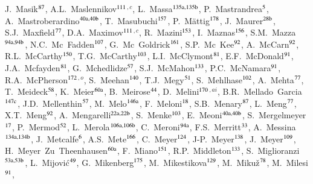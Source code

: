 \begin{flushleft}
J.~Masik$^\textrm{\scriptsize 87}$,
A.L.~Maslennikov$^\textrm{\scriptsize 111}$$^{,c}$,
L.~Massa$^\textrm{\scriptsize 135a,135b}$,
P.~Mastrandrea$^\textrm{\scriptsize 5}$,
A.~Mastroberardino$^\textrm{\scriptsize 40a,40b}$,
T.~Masubuchi$^\textrm{\scriptsize 157}$,
P.~M\"attig$^\textrm{\scriptsize 178}$,
J.~Maurer$^\textrm{\scriptsize 28b}$,
S.J.~Maxfield$^\textrm{\scriptsize 77}$,
D.A.~Maximov$^\textrm{\scriptsize 111}$$^{,c}$,
R.~Mazini$^\textrm{\scriptsize 153}$,
I.~Maznas$^\textrm{\scriptsize 156}$,
S.M.~Mazza$^\textrm{\scriptsize 94a,94b}$,
N.C.~Mc~Fadden$^\textrm{\scriptsize 107}$,
G.~Mc~Goldrick$^\textrm{\scriptsize 161}$,
S.P.~Mc~Kee$^\textrm{\scriptsize 92}$,
A.~McCarn$^\textrm{\scriptsize 92}$,
R.L.~McCarthy$^\textrm{\scriptsize 150}$,
T.G.~McCarthy$^\textrm{\scriptsize 103}$,
L.I.~McClymont$^\textrm{\scriptsize 81}$,
E.F.~McDonald$^\textrm{\scriptsize 91}$,
J.A.~Mcfayden$^\textrm{\scriptsize 81}$,
G.~Mchedlidze$^\textrm{\scriptsize 57}$,
S.J.~McMahon$^\textrm{\scriptsize 133}$,
P.C.~McNamara$^\textrm{\scriptsize 91}$,
R.A.~McPherson$^\textrm{\scriptsize 172}$$^{,o}$,
S.~Meehan$^\textrm{\scriptsize 140}$,
T.J.~Megy$^\textrm{\scriptsize 51}$,
S.~Mehlhase$^\textrm{\scriptsize 102}$,
A.~Mehta$^\textrm{\scriptsize 77}$,
T.~Meideck$^\textrm{\scriptsize 58}$,
K.~Meier$^\textrm{\scriptsize 60a}$,
B.~Meirose$^\textrm{\scriptsize 44}$,
D.~Melini$^\textrm{\scriptsize 170}$$^{,ai}$,
B.R.~Mellado~Garcia$^\textrm{\scriptsize 147c}$,
J.D.~Mellenthin$^\textrm{\scriptsize 57}$,
M.~Melo$^\textrm{\scriptsize 146a}$,
F.~Meloni$^\textrm{\scriptsize 18}$,
S.B.~Menary$^\textrm{\scriptsize 87}$,
L.~Meng$^\textrm{\scriptsize 77}$,
X.T.~Meng$^\textrm{\scriptsize 92}$,
A.~Mengarelli$^\textrm{\scriptsize 22a,22b}$,
S.~Menke$^\textrm{\scriptsize 103}$,
E.~Meoni$^\textrm{\scriptsize 40a,40b}$,
S.~Mergelmeyer$^\textrm{\scriptsize 17}$,
P.~Mermod$^\textrm{\scriptsize 52}$,
L.~Merola$^\textrm{\scriptsize 106a,106b}$,
C.~Meroni$^\textrm{\scriptsize 94a}$,
F.S.~Merritt$^\textrm{\scriptsize 33}$,
A.~Messina$^\textrm{\scriptsize 134a,134b}$,
J.~Metcalfe$^\textrm{\scriptsize 6}$,
A.S.~Mete$^\textrm{\scriptsize 166}$,
C.~Meyer$^\textrm{\scriptsize 124}$,
J-P.~Meyer$^\textrm{\scriptsize 138}$,
J.~Meyer$^\textrm{\scriptsize 109}$,
H.~Meyer~Zu~Theenhausen$^\textrm{\scriptsize 60a}$,
F.~Miano$^\textrm{\scriptsize 151}$,
R.P.~Middleton$^\textrm{\scriptsize 133}$,
S.~Miglioranzi$^\textrm{\scriptsize 53a,53b}$,
L.~Mijovi\'{c}$^\textrm{\scriptsize 49}$,
G.~Mikenberg$^\textrm{\scriptsize 175}$,
M.~Mikestikova$^\textrm{\scriptsize 129}$,
M.~Miku\v{z}$^\textrm{\scriptsize 78}$,
M.~Milesi$^\textrm{\scriptsize 91}$,

\end{flushleft}
